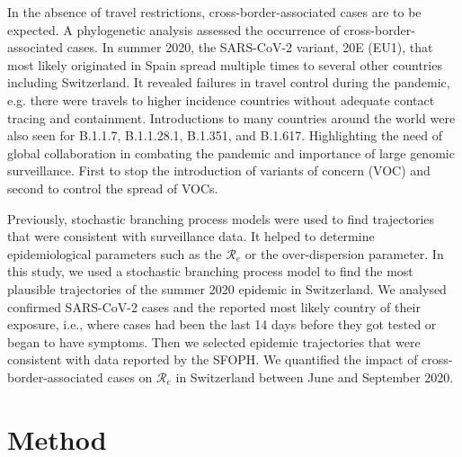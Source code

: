 \documentclass[10pt, a4paper, twoside]{article}
\begin{document}
\begin{multicols}{2}
In the absence of travel restrictions, cross-border-associated cases are to be expected.\cite{russell_effect_2021} 
A phylogenetic analysis assessed the occurrence of cross-border-associated cases.\cite{hodcroft_emergence_2020}
In summer 2020, the SARS-CoV-2 variant, 20E (EU1), that most likely originated in Spain spread multiple times to several other countries including Switzerland.\cite{hodcroft_emergence_2020}
It revealed failures in travel control during the pandemic, e.g. there were travels to higher incidence countries without adequate contact tracing and containment.\cite{hodcroft_emergence_2020}
Introductions to many countries around the world were also seen for B.1.1.7, B.1.1.28.1, B.1.351, and B.1.617.\cite{davies_estimated_2021,faria_genomics_2021,tegally_detection_2021,cherian_convergent_2021} 
Highlighting the need of global collaboration in combating the pandemic and importance of large genomic surveillance.
First to stop the introduction of variants of concern (VOC) and second to control the spread of VOCs.

Previously, stochastic branching process models were used to find trajectories that were consistent with surveillance data.\cite{althaus_ebola_2015,riou_pattern_2020}
It helped to determine epidemiological parameters such as the $\mathcal{R}_e$ or the over-dispersion parameter.\cite{althaus_ebola_2015,riou_pattern_2020}
In this study, we used a stochastic branching process model to find the most plausible trajectories of the summer 2020 epidemic in Switzerland.
We analysed confirmed SARS-CoV-2 cases and the reported most likely country of their exposure, i.e., where cases had been the last 14 days before they got tested or began to have symptoms.
Then we selected epidemic trajectories that were consistent with data reported by the SFOPH.
We quantified the impact of cross-border-associated cases on $\mathcal{R}_e$ in Switzerland between June and September 2020.

\section{Method}


\end{multicols}
\end{document}
